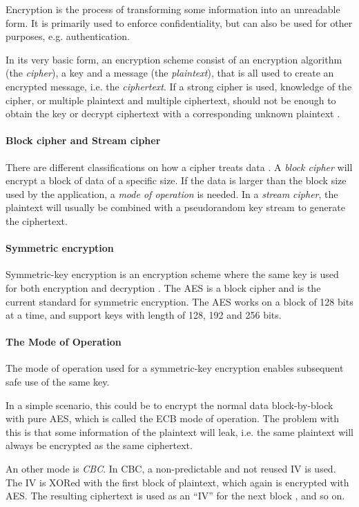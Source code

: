 \documentclass[pdftex,english,10pt,b5paper,twoside]{book}
\begin{document}
Encryption is the process of transforming some information into an unreadable
form. It is primarily used to enforce confidentiality, but can also be
used for other purposes, e.g. authentication. 

In its very basic form, an encryption scheme consist of an encryption algorithm
(the \emph{cipher}), a key and a message (the \emph{plaintext}), that is all
used to create an encrypted message, i.e. the \emph{ciphertext}. If a strong
cipher is used, knowledge of the cipher, or multiple plaintext and multiple
ciphertext, should not be enough to obtain the key or decrypt ciphertext with a
corresponding unknown plaintext \cite[p. 30]{stallings}.

\paragraph{Block cipher and Stream cipher} There are different classifications
on how a cipher treats data \cite[p. 32]{stallings}. A \emph{block cipher} will
encrypt a block of data of a specific size. If the data is larger than the
block size used by the application, a \emph{mode of operation} is needed. In a
\emph{stream cipher}, the plaintext will usually be combined with a pseudorandom key
stream to generate the ciphertext.

\paragraph{Symmetric encryption} Symmetric-key encryption is an encryption scheme
where the same key is used for both encryption and decryption \cite[p.
32]{stallings}. The \ac{AES} is a block cipher and is the current standard for
symmetric encryption. The \ac{AES} works on a block of 128 bits at a time,
and support keys with length of 128, 192 and 256 bits.

\paragraph{The Mode of Operation} The mode of operation used for a
symmetric-key encryption enables subsequent safe use of the same key.

In a simple scenario, this could be to encrypt the normal data block-by-block
with pure \ac{AES}, which is called the \ac{ECB} mode of operation. The problem
with this is that some information of the plaintext will leak, i.e. the same
plaintext will always be encrypted as the same ciphertext.

An other mode is \emph{\ac{CBC}}. In \ac{CBC}, a non-predictable and not reused
\ac{IV} is used. The \ac{IV} is XORed with the first block of plaintext, which
again is encrypted with \ac{AES}. The resulting ciphertext is used as an
``\ac{IV}'' for the next block \cite[p. 183]{stallings}, and so on.
\end{document}
